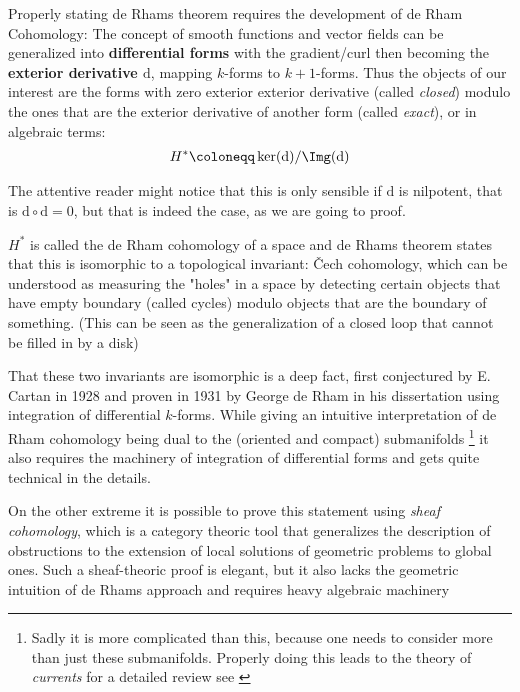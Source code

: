 Properly stating de Rhams theorem requires the development of de Rham Cohomology: The concept of smooth
functions and vector fields can be generalized into \textbf{differential forms} with the gradient/curl then
becoming the \textbf{exterior derivative $\mathrm{d}$}, mapping $k$-forms to $k+1$-forms. Thus the objects
of our interest are the forms with zero exterior exterior derivative (called \textit{closed}) modulo the ones that are
the exterior derivative of another form (called \textit{exact}), or in algebraic terms:
\begin{align*}
	H^* \coloneqq \ker(\mathrm{d}) / \Img(\mathrm{d})
\end{align*}

\begin{remark}
The attentive reader might notice that this is only sensible if $\mathrm{d}$ is nilpotent, that
is $\mathrm{d} \circ \mathrm{d} = 0$, but that is indeed the case, as we are going to proof.
\end{remark}

$H^*$ is called the de Rham cohomology of a space and de Rhams theorem states that this is
isomorphic to a topological invariant: Čech cohomology, which can be understood as measuring the "holes"
in a space by detecting certain objects that have empty boundary (called cycles) modulo objects that are the
boundary of something. (This can be seen as the generalization of a closed loop that cannot be filled in by a disk)

That these two invariants are isomorphic is a deep fact, first conjectured by E. Cartan in 1928 and
proven in 1931 by George de Rham in his dissertation \cite{de_rham_sur_1931} using integration
of differential $k$-forms. While giving an intuitive interpretation of de Rham cohomology being dual to the
(oriented and compact) submanifolds
\footnote{
	Sadly it is more complicated than this, because one needs to consider more than just these submanifolds.
	Properly doing this leads to the theory of \textit{currents} for a detailed review see \cite{de_rham_differentiable_1984}
}
it also requires the machinery of integration of differential forms and gets quite technical in the details.

On the other extreme it is possible to prove this statement using \textit{sheaf cohomology}, which is a category theoric tool
that generalizes the description of obstructions to the extension of local solutions of geometric problems to global ones.
Such a sheaf-theoric proof is elegant, but it also lacks the geometric intuition of de Rhams approach and requires heavy
algebraic machinery

